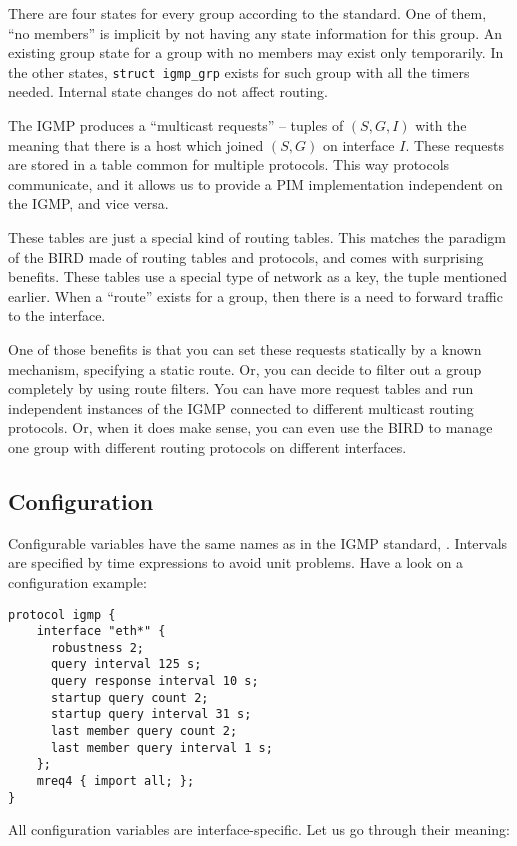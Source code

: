 There are four states for every group according to the standard. One of them,
``no members'' is implicit by not having any state information for this group.
An existing group state for a group with no members may exist only temporarily.
In the other states, \texttt{struct igmp\_grp} exists for such group with all
the timers needed. Internal state changes do not affect routing.

The IGMP produces a ``multicast requests'' -- tuples of $(S, G, I)$ with the
meaning that there is a host which joined $(S, G)$ on interface $I$. These
requests are stored in a table common for multiple protocols. This way
protocols communicate, and it allows us to provide a PIM implementation
independent on the IGMP, and vice versa.

These tables are just a special kind of routing tables. This matches the
paradigm of the BIRD made of routing tables and protocols, and comes with
surprising benefits. These tables use a special type of network as a key, the
tuple mentioned earlier. When a ``route'' exists for a group, then there is
a need to forward traffic to the interface.

One of those benefits is that you can set these requests statically by a known
mechanism, specifying a static route. Or, you can decide to filter out a group
completely by using route filters. You can have more request tables and run
independent instances of the IGMP connected to different multicast routing
protocols. Or, when it does make sense, you can even use the BIRD to manage one
group with different routing protocols on different interfaces.

\subsection{Configuration}

Configurable variables have the same names as in the IGMP standard, .
Intervals are specified by time expressions to avoid unit problems. Have a look
on a configuration example:

\begin{lstlisting}
protocol igmp {
	interface "eth*" {
	  robustness 2;
	  query interval 125 s;
	  query response interval 10 s;
	  startup query count 2;
	  startup query interval 31 s;
	  last member query count 2;
	  last member query interval 1 s;
	};
	mreq4 { import all; };
}
\end{lstlisting}

All configuration variables are interface-specific. Let us go through their meaning:


